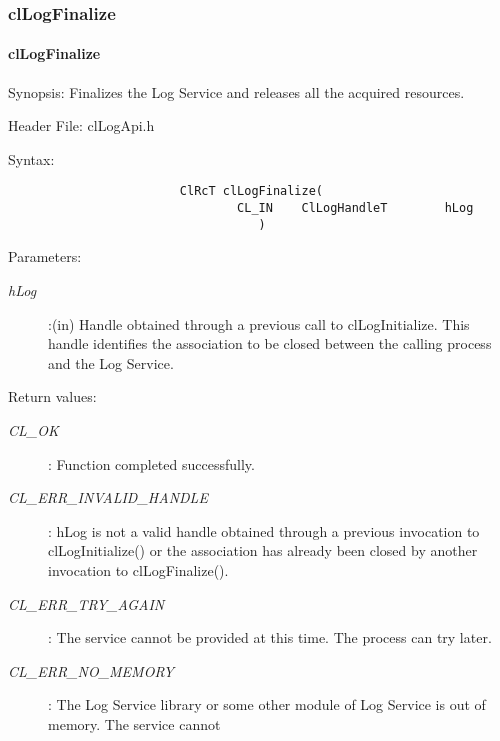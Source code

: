 \begin{flushleft}
\subsubsection{clLogFinalize}
\hypertarget{pagelog102}{}\paragraph{cl\-Log\-Finalize}\label{pagelog102}
\begin{Desc}
\item[Synopsis:]Finalizes the Log Service and releases all the acquired resources.\end{Desc}
\begin{Desc}
\item[Header File:] clLogApi.h \end{Desc}
\begin{Desc}
\item[Syntax:]
\footnotesize\begin{verbatim}        	
						ClRcT clLogFinalize(
           						CL_IN    ClLogHandleT        hLog
								   )
\end{verbatim}
\normalsize
\end{Desc}
\begin{Desc}
\item[Parameters:] \begin{description}
\item[{\em hLog}]:(in) Handle obtained through a previous call to clLogInitialize. This handle identifies the association to be closed between the 
calling process and the Log Service.
\end{description}
\end{Desc}
\begin{Desc}
\item[Return values:]
\begin{description}
\item[{\em CL\_\-OK}]: Function completed successfully.
\item[{\em CL\_\-ERR\_\-INVALID\_\-HANDLE}]: hLog is not a valid handle obtained through a previous invocation to 
clLogInitialize() or the association has already been closed by another invocation to clLogFinalize().
\item[{\em CL\_\-ERR\_\-TRY\_\-AGAIN}]: The service cannot be provided at this time. The process can try later.
\item[{\em CL\_\-ERR\_\-NO\_\-MEMORY}]: The Log Service library or some other module of Log Service is out of memory. The service cannot 

\end{description}
\end{Desc}
\end{flushleft}
